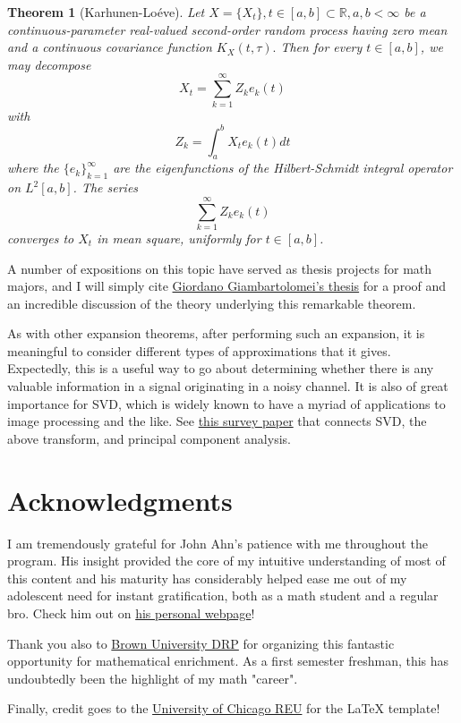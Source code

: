 \documentclass{article}
\newtheorem{thm}{Theorem}[section]
\theoremstyle{definition}
\theoremstyle{remark}
\numberwithin{equation}{section}
\begin{document}
\begin{thm}[Karhunen-Lo\'{e}ve]
Let $X = \{ X_t \}, t \in [a, b] \subset \mathbb{R}, a, b < \infty$ be a continuous-parameter real-valued second-order random process having zero mean and a continuous covariance function $K_X(t, \tau).$ Then for every $t \in[a,b]$, we may decompose 
$$X_t = \sum ^\infty _{k = 1} Z_k e_k (t) $$
with 
$$Z_k = \int _a ^b X_t e_k (t) dt $$
where the $\{e_k \} ^\infty _{k=1}$ are the eigenfunctions of the Hilbert-Schmidt integral operator on $L^2[a,b]$. The series 
$$\sum _{k=1}^\infty Z_k e_k(t) $$
converges to $X_t$ in mean square, uniformly for $t \in [a,b]$.
\end{thm}

A number of expositions on this topic have served as thesis projects for math majors, and I will simply cite \href{https://core.ac.uk/download/pdf/31159449.pdf}{Giordano Giambartolomei's thesis} for a proof and an incredible discussion of the theory underlying this remarkable theorem. 

As with other expansion theorems, after performing such an expansion, it is meaningful to consider different types of approximations that it gives. Expectedly, this is a useful way to go about determining whether there is any valuable information in a signal originating in a noisy channel. It is also of great importance for SVD, which is widely known to have a myriad of applications to image processing and the like. See \href{http://fourier.eng.hmc.edu/book/lectures/KLTnSVD.pdf}{this survey paper} that connects SVD, the above transform, and principal component analysis. 

\section{Acknowledgments}  I am tremendously grateful for John Ahn's patience with me throughout the program. His insight provided the core of my intuitive understanding of most of this content and his maturity has considerably helped ease me out of my adolescent need for instant gratification, both as a math student and a regular bro. Check him out on \href{https://jtahn.github.io/about/}{his personal webpage}! 

Thank you also to \href{https://www.math.brown.edu/drp/}{Brown University DRP} for organizing this fantastic opportunity for mathematical enrichment. As a first semester freshman, this has undoubtedly been the highlight of my math "career". 

Finally, credit goes to the \href{https://math.uchicago.edu/~may/REU2021/}{University of Chicago REU} for the \LaTeX $ $ template!
\end{document}
